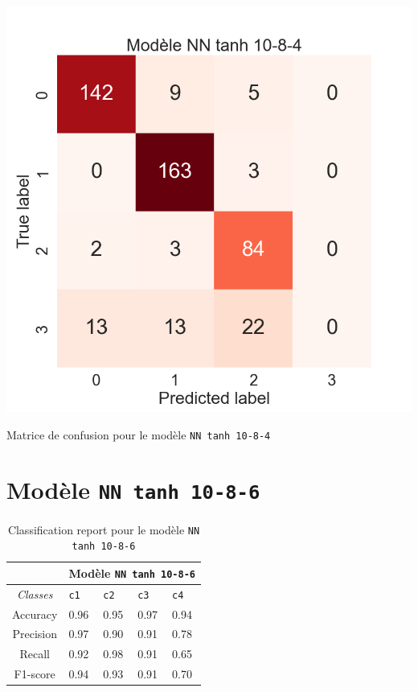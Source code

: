 \begin{table}[H]
    \includegraphics[scale=0.5]{images/y_pred_NN_tanh_10-8-4.png}
    \caption{\label{HomePage} Matrice de confusion pour le modèle \texttt{NN tanh 10-8-4}}
\end{table}

\newpage

\section{Modèle \texttt{NN tanh 10-8-6}}

\begin{table}[ht]
  \begin{tabular}{ m{5em} | m{1cm}| m{1cm} | m{1cm}| m{1cm} | } 
  \cline{2-5}
             & \multicolumn{4}{|c|}{Modèle \texttt{NN tanh 10-8-6}}\\
 \hline
 \multicolumn{1}{|c|}{\textit{Classes}} & \hfil \texttt{c1} & \hfil \texttt{c2} & \hfil \texttt{c3} & \hfil \texttt{c4} \\ 
  \hline
  \multicolumn{1}{|c|}{Accuracy} & \hfil 0.96 & \hfil 0.95 & \hfil 0.97 & \hfil 0.94 \\ 
  \hline
  \multicolumn{1}{|c|}{Precision} & \hfil 0.97 & \hfil 0.90 & \hfil 0.91 & \hfil 0.78 \\ 
  \hline
  \multicolumn{1}{|c|}{Recall} & \hfil 0.92 & \hfil 0.98 & \hfil 0.91 & \hfil 0.65 \\ 
  \hline
  \multicolumn{1}{|c|}{F1-score} & \hfil 0.94 & \hfil 0.93 & \hfil 0.91 & \hfil 0.70 \\ 
  \hline
\end{tabular}
\caption{Classification report pour le modèle \texttt{NN tanh 10-8-6}}
  \label{Tab:Tcr}
\end{table}

